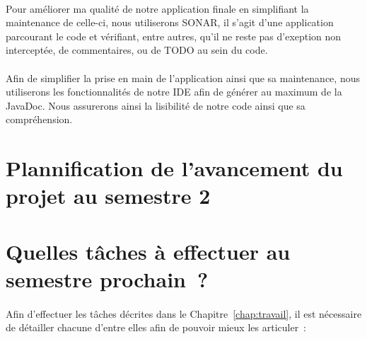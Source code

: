 \paragraph{}
Pour améliorer ma qualité de notre application finale en simplifiant la maintenance de celle-ci, nous utiliserons SONAR, il s'agit d'une application parcourant le code et vérifiant, entre autres, qu'il ne reste pas d'exeption non interceptée, de commentaires, ou de TODO au sein du code.

\paragraph{}
Afin de simplifier la prise en main de l'application ainsi que sa maintenance, nous utiliserons les fonctionnalités de notre IDE afin de générer au maximum de la JavaDoc. Nous assurerons ainsi la lisibilité de notre code ainsi que sa compréhension.

\section{Plannification de l'avancement du projet au semestre 2}


\section{Quelles tâches à effectuer au semestre prochain~?}

\paragraph{}
Afin d'effectuer les tâches décrites dans le Chapitre~\ref{chap:travail}, il est nécessaire de détailler chacune d'entre elles afin de pouvoir mieux les articuler~:

